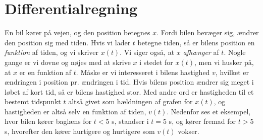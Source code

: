 \section{Differentialregning}
En bil kører på vejen, og den position betegnes $x$. Fordi bilen
bevæger sig, ændrer den position sig med tiden. Hvis vi lader $t$
betegne tiden, så er bilens position en \emph{funktion} af tiden, og
vi skriver $x(t)$. Vi siger også, at $x$ \emph{afhænger} af $t$. Nogle
gange er vi dovne og nøjes med at skrive $x$ i stedet for $x(t)$, men
vi husker på, at $x$ er en funktion af $t$. Måske er vi interesseret i
bilens hastighed $v$, hvilket er ændringen i position pr. ændringen i
tid. Hvis bilens position ændrer sig meget i løbet af kort tid, så er
bilens hastighed stor. Med andre ord er hastigheden til et bestemt
tidspunkt $t$ altså givet som hældningen af grafen for $x(t)$, og
hastigheden er altså selv en funktion af tiden, $v(t)$. Nedenfor ses
et eksempel, hvor bilen kører baglæns for $t<5$ s, standser i $t=5$ s,
og kører fremad for $t>5$ s, hvorefter den kører hurtigere og
hurtigere som $v(t)$ vokser.

\begin{center}
\end{center}

